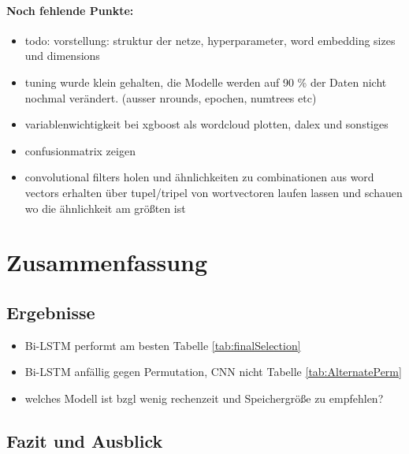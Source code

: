 \documentclass[a4paper,11pt]{article}
\begin{document}
\paragraph{Noch fehlende Punkte:}

\begin{itemize}
    \item todo: vorstellung: struktur der netze, hyperparameter, word embedding sizes und dimensions
    \item tuning wurde klein gehalten, die Modelle werden auf 90 \% der Daten nicht nochmal verändert. (ausser nrounds, epochen, numtrees etc)
\end{itemize}{}



\begin{itemize}
    \item variablenwichtigkeit bei xgboost als wordcloud plotten, dalex und sonstiges
    \item confusionmatrix zeigen
    \item convolutional filters holen und ähnlichkeiten zu combinationen aus word vectors erhalten über tupel/tripel von wortvectoren laufen lassen und schauen wo die ähnlichkeit am größten ist
\end{itemize}{}


\section{Zusammenfassung}

\subsection{Ergebnisse}

\begin{itemize}
    \item Bi-LSTM performt am besten Tabelle \ref{tab:finalSelection}
    \item Bi-LSTM anfällig gegen Permutation, CNN nicht Tabelle \ref{tab:AlternatePerm}
    \item welches Modell ist bzgl wenig rechenzeit und Speichergröße zu empfehlen?
\end{itemize}{}



\subsection{Fazit und Ausblick}
\end{document}
